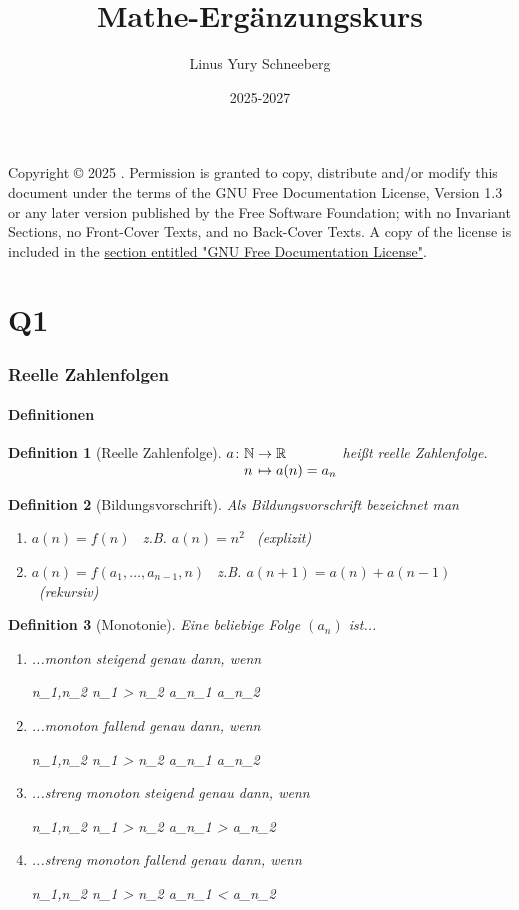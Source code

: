 \documentclass{article}
\title{Mathe-Ergänzungskurs}
\author{Linus Yury Schneeberg}
\date{2025-2027}
\newcommand\func[5]{%
	\begingroup
	\setlength\arraycolsep{0pt}
	#1\colon\begin{array}[t]{l >{{}}c<{{}} l}
		#2 & \to & #3 \\ #4 & \mapsto & #5 
	\end{array}%
	\endgroup}
\newtheorem{defn}{Definition}[section]
\newenvironment{aleq*}{\begin{equation*}\begin{aligned}}{\end{aligned}\end{equation*}}
\newcommand{\LICENSE}{
	Copyright \copyright{} 2025 \theauthor.
	Permission is granted to copy, distribute and/or modify this document
	under the terms of the GNU Free Documentation License, Version 1.3
	or any later version published by the Free Software Foundation;
	with no Invariant Sections, no Front-Cover Texts, and no Back-Cover Texts.
	A copy of the license is included in the \hyperref[sec:fdl]{section entitled "GNU
	Free Documentation License"}.
}
\begin{document}
	\maketitle
	\tableofcontents
	\vfill
	\LICENSE
	\newpage
	
	\part{Q1}
	\section{Reelle Zahlenfolgen}
	\subsection{Definitionen}
	\begin{defn}[Reelle Zahlenfolge]
		\quad\newline
	\(\func{a}{\mathbb{N}}{\mathbb{R}}{n}{a(n)=a_n}\) heißt reelle Zahlenfolge.
	\end{defn}
	\begin{defn}[Bildungsvorschrift]
		Als Bildungsvorschrift bezeichnet man 
		\begin{enumerate}[label=(\alph*)]
			\item \(a(n) = f(n)\) \ z.B. \(a(n) = n^2\) \ (explizit)
			\item \(a(n) = f(a_1, \dots, a_{n-1}, n)\) \ z.B. \(a(n+1) = a(n) + a(n-1)\) \ (rekursiv)
		\end{enumerate}
	\end{defn}
	
	\begin{defn}[Monotonie]
		\label{defMonotonie}
	Eine beliebige Folge \((a_n)\) ist...
	\begin{enumerate}
		\item ...monton steigend genau dann, wenn
		\begin{aleq*}
			\forall n_1,n_2 \in {} \colon n_1 > n_2 \implies a_{n_1} \geq a_{n_2} 
		\end{aleq*}
		
		\item ...monoton fallend genau dann, wenn
		\begin{aleq*}
			\forall n_1,n_2 \in {} \colon n_1 > n_2 \implies a_{n_1} \leq a_{n_2} \text{.}
		\end{aleq*}
		
		\item ...streng monoton steigend genau dann, wenn
		\begin{aleq*}
			\forall n_1,n_2 \in {} \colon n_1 > n_2 \implies a_{n_1} > a_{n_2} 
		\end{aleq*}
		
		\item ...streng monoton fallend genau dann, wenn
		\begin{aleq*}
			\forall n_1,n_2 \in {} \colon n_1 > n_2 \implies a_{n_1} < a_{n_2} \text{.}
		\end{aleq*}
	\end{enumerate}
	\end{defn}
	
\end{document}
